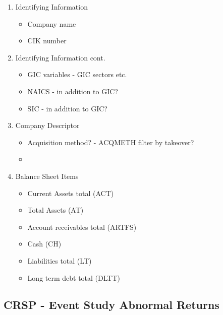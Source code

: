\documentclass[12pt]{article}
\begin{document}
    \begin{enumerate}
        \item Identifying Information

            \begin{itemize}
                \item Company name 
                \item CIK number 
            \end{itemize}
    
        \item Identifying Information cont.  
        
            \begin{itemize}
                \item GIC variables - GIC sectors etc.
                \item NAICS - in addition to GIC? 
                \item SIC - in addition to GIC?
            \end{itemize}

        \item Company Descriptor

            \begin{itemize}
                \item Acquisition method? - ACQMETH filter by takeover? 
                \item 
            \end{itemize}
        
        \item Balance Sheet Items 

            \begin{itemize}
                \item Current Assets total (ACT)
                \item Total Assets (AT)
                \item Account receivables total (ARTFS)
                \item Cash (CH)
                \item Liabilities total (LT) 
                \item Long term debt total (DLTT)
            \end{itemize}
        
    \end{enumerate}


    \subsection{CRSP - Event Study Abnormal Returns}
\end{document}
